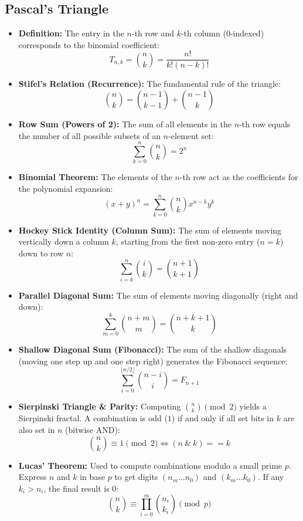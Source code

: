 \subsection{Pascal's Triangle}

\begin{itemize}
    \item \textbf{Definition: } The entry in the $n$-th row and $k$-th column (0-indexed) corresponds to the binomial coefficient:
          $$ T_{n,k} = \binom{n}{k} = \frac{n!}{k!(n-k)!} $$
          
    \item \textbf{Stifel's Relation (Recurrence): } The fundamental rule of the triangle:
          $$ \binom{n}{k} = \binom{n-1}{k-1} + \binom{n-1}{k} $$
          
    \item \textbf{Row Sum (Powers of 2): } The sum of all elements in the $n$-th row equals the number of all possible subsets of an $n$-element set:
          $$ \sum_{k=0}^{n} \binom{n}{k} = 2^n $$
          
    \item \textbf{Binomial Theorem: } The elements of the $n$-th row act as the coefficients for the polynomial expansion:
          $$ (x + y)^n = \sum_{k=0}^{n} \binom{n}{k} x^{n-k} y^k $$
          
    \item \textbf{Hockey Stick Identity (Column Sum): } The sum of elements moving vertically down a column $k$, starting from the first non-zero entry ($n=k$) down to row $n$:
          $$ \sum_{i=k}^{n} \binom{i}{k} = \binom{n+1}{k+1} $$
          
    \item \textbf{Parallel Diagonal Sum: } The sum of elements moving diagonally (right and down):
          $$ \sum_{m=0}^{k} \binom{n+m}{m} = \binom{n+k+1}{k} $$
          
    \item \textbf{Shallow Diagonal Sum (Fibonacci): } The sum of the shallow diagonals (moving one step up and one step right) generates the Fibonacci sequence:
          $$ \sum_{i=0}^{\lfloor n/2 \rfloor} \binom{n-i}{i} = F_{n+1} $$
          
    \item \textbf{Sierpinski Triangle \& Parity: } Computing $\binom{n}{k} \pmod 2$ yields a Sierpinski fractal. A combination is odd ($1$) if and only if all set bits in $k$ are also set in $n$ (bitwise AND):
          $$ \binom{n}{k} \equiv 1 \pmod 2 \iff (n \ \& \ k) == k $$
          
    \item \textbf{Lucas' Theorem: } Used to compute combinations modulo a small prime $p$. Express $n$ and $k$ in base $p$ to get digits $(n_m \dots n_0)$ and $(k_m \dots k_0)$. If any $k_i > n_i$, the final result is 0:
          $$ \binom{n}{k} \equiv \prod_{i=0}^{m} \binom{n_i}{k_i} \pmod p $$
\end{itemize}